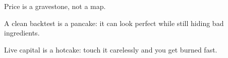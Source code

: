 
\newcommand{\registermetaphor}[2]{%
    \expandafter\def\csname metaphor@#1\endcsname{#2}%
}

\newcommand{\metaphortext}[1]{%
    \ifcsname metaphor@#1\endcsname
        \csname metaphor@#1\endcsname
    \else
        \textbf{[Undefined metaphor key: #1]}%
    \fi
}

\newcommand{\metaphorbykey}[2]{\metaphor{#2}{\metaphortext{#1}}}

\registermetaphor{gravestone}{Price is a gravestone, not a map.}
\registermetaphor{pancake}{A clean backtest is a pancake: it can look perfect while still hiding bad ingredients.}
\registermetaphor{hotcake}{Live capital is a hotcake: touch it carelessly and you get burned fast.}
